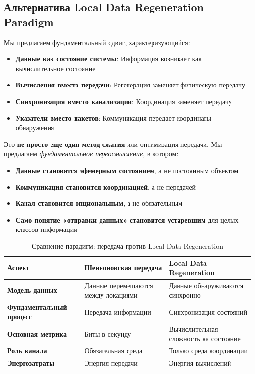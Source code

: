 \documentclass[11pt,a4paper]{article}
\begin{document}
\subsection{Альтернатива Local Data Regeneration Paradigm}

Мы предлагаем фундаментальный сдвиг, характеризующийся:

\begin{itemize}
    \item \textbf{Данные как состояние системы}: Информация возникает как вычислительное состояние
    \item \textbf{Вычисления вместо передачи}: Регенерация заменяет физическую передачу
    \item \textbf{Синхронизация вместо канализации}: Координация заменяет передачу
    \item \textbf{Указатели вместо пакетов}: Коммуникация передает координаты обнаружения
\end{itemize}

\noindent Это \textbf{не просто еще один метод сжатия} или оптимизация передачи. Мы предлагаем \emph{фундаментальное переосмысление}, в котором:

\begin{itemize}
    \item \textbf{Данные становятся эфемерным состоянием}, а не постоянным объектом
    \item \textbf{Коммуникация становится координацией}, а не передачей
    \item \textbf{Канал становится опциональным}, а не обязательным
    \item \textbf{Само понятие «отправки данных» становится устаревшим} для целых классов информации
\end{itemize}

\begin{table}[h]
\centering
\caption{Сравнение парадигм: передача против Local Data Regeneration}
\begin{tabularx}{\textwidth}{|l|X|X|}
\hline
\textbf{Аспект} & \textbf{Шенноновская передача} & \textbf{Local Data Regeneration} \\
\hline
\textbf{Модель данных} & Данные перемещаются между локациями & Данные обнаруживаются синхронно \\
\hline
\textbf{Фундаментальный процесс} & Передача информации & Синхронизация состояний \\
\hline
\textbf{Основная метрика} & Биты в секунду & Вычислительная сложность на состояние \\
\hline
\textbf{Роль канала} & Обязательная среда & Только среда координации \\
\hline
\textbf{Энергозатраты} & Энергия передачи & Энергия вычислений \\
\hline
\end{tabularx}
\end{table}
\end{document}
